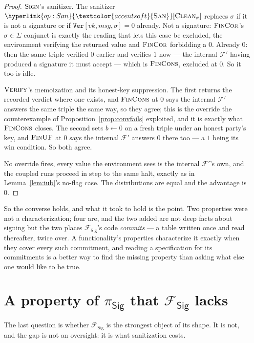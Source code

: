 \documentclass[10pt,oneside,openany]{book}
\newcommand{\F}{\mathcal{F}}
\newcommand{\op}[1]{\textnormal{\textsc{#1}}}
\newcommand{\opl}[1]{\hyperlink{op:#1}{\textcolor{accentsoft}{\op{#1}}}}
\newcommand{\Fsig}{\mathcal{F}_{\mathsf{Sig}}}
\newcommand{\psig}{\pi_{\mathsf{Sig}}}
\newcommand{\vk}{\mathit{vk}}
\newcommand{\msg}{\mathit{msg}}
\newcommand{\Sigs}{\Sigma}
\newcommand{\San}{\opl{San}}
\newcommand{\Clean}{\op{Clean}}
\newcommand{\V}[1]{\mathtt{#1}}
\theoremstyle{accentdef}
\theoremstyle{accentplain}
\begin{document}
\begin{proof}
$\op{Sign}$'s sanitizer. The sanitizer $\San[\Clean_{\sigma}]$ replaces $\sigma$ if it is not a signature or if
$\V{Ver}[\vk,\msg,\sigma] = 0$ already. Not a signature: $\op{FinCor}$'s $\sigma \in \Sigs$
conjunct is exactly the reading that lets this case be excluded, the environment verifying the
returned value and $\op{FinCor}$ forbidding a $0$. Already $0$: then the same triple verified $0$
earlier and verifies $1$ now --- the internal $\F'$ having produced a signature it must accept ---
which is $\op{FinCons}$, excluded at $0$. So it too is idle.

$\op{Verify}$'s memoization and its honest-key suppression. The first returns the recorded verdict
where one exists, and $\op{FinCons}$ at $0$ says the internal $\F'$ answers the same triple the
same way, so they agree; this is the override the counterexample of
Proposition~\ref{prop:convfails} exploited, and it is exactly what $\op{FinCons}$ closes. The
second sets $b \gets 0$ on a fresh triple under an honest party's key, and $\op{FinUF}$ at $0$ says
the internal $\F'$ answers $0$ there too --- a $1$ being its win condition. So both agree.

No override fires, every value the environment sees is the internal $\F'$'s own, and the coupled
runs proceed in step to the same halt, exactly as in Lemma~\ref{lem:iub}'s no-flag case. The
distributions are equal and the advantage is $0$.
\end{proof}

So the converse holds, and what it took to hold is the point. Two properties were not a
characterization; four are, and the two added are not deep facts about signing but the two places
$\Fsig$'s code \emph{commits} --- a table written once and read thereafter, twice over. A
functionality's properties characterize it exactly when they cover every such commitment, and
reading a specification for its commitments is a better way to find the missing property than
asking what else one would like to be true.

\section{A property of \texorpdfstring{$\psig$}{π\_Sig} that \texorpdfstring{$\Fsig$}{F\_Sig} lacks}\label{sec:sigcoll}

The last question is whether $\Fsig$ is the strongest object of its shape. It is not, and the
gap is not an oversight: it is what sanitization costs.
\end{document}
